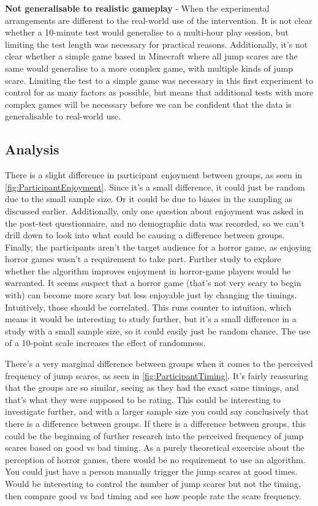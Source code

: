 \documentclass[12pt,a4paper]{article}\usepackage[]{graphicx}\usepackage[]{color}
\begin{document}
\textbf{Not generalisable to realistic gameplay} - When the experimental arrangements are different to the real-world use of the intervention.
It is not clear whether a 10-minute test would generalise to a multi-hour play session, but limiting the test length was necessary for practical reasons.
Additionally, it's not clear whether a simple game based in Minecraft where all jump scares are the same would generalise to a more complex game, with multiple kinds of jump scare.
Limiting the test to a simple game was necessary in this first experiment to control for as many factors as possible, but means that additional tests with more complex games will be necessary before we can be confident that the data is generalisable to real-world use.

\subsection{Analysis}
There is a slight difference in participant enjoyment between groups, as seen in \vref{fig:ParticipantEnjoyment}.
Since it's a small difference, it could just be random due to the small sample size.
Or it could be due to biases in the sampling as discussed earlier.
Additionally, only one question about enjoyment was asked in the post-test questionnaire, and no demographic data was recorded, so we can't drill down to look into what could be causing a difference between groups.
Finally, the participants aren't the target audience for a horror game, as enjoying horror games wasn't a requirement to take part.
Further study to explore whether the algorithm improves enjoyment in horror-game players would be warranted.
It seems suspect that a horror game (that's not very scary to begin with) can become more scary but less enjoyable just by changing the timings.
Intuitively, those should be correlated.
This runs counter to intuition, which means it would be interesting to study further, but it's a small difference in a study with a small sample size, so it could easily just be random chance.
The use of a 10-point scale increases the effect of randomness.

There's a very marginal difference between groups when it comes to the perceived frequency of jump scares, as seen in \vref{fig:ParticipantTiming}.
It's fairly reassuring that the groups are so similar, seeing as they had the exact same timings, and that's what they were supposed to be rating.
This could be interesting to investigate further, and with a larger sample size you could say conclusively that there is a difference between groups.
If there is a difference between groups, this could be the beginning of further research into the perceived frequency of jump scares based on good vs bad timing.
As a purely theoretical excercise about the perception of horror games, there would be no requirement to use an algorithm.
You could just have a person manually trigger the jump scares at good times.
Would be interesting to control the number of jump scares but not the timing, then compare good vs bad timing and see how people rate the scare frequency.
\end{document}
